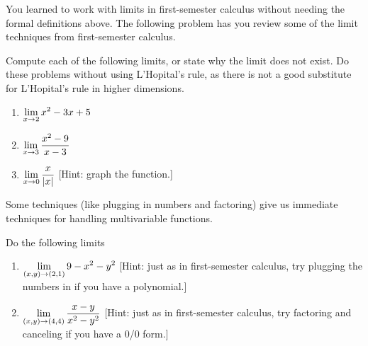 You learned to work with limits in first-semester calculus without needing the formal definitions above. The following problem has you review some of the limit techniques from first-semester calculus.
\begin{problem}%
 Compute each of the following limits, or state why the limit does not exist. Do these problems without using L'Hopital's rule, as there is not a good substitute for L'Hopital's rule in higher dimensions. 
\begin{enumerate}
 \item $\displaystyle \lim_{x\to 2} x^2-3x+5$
 \item $\displaystyle\lim_{x\to 3}\frac{x^2-9}{x-3}$
 \item $\displaystyle\lim_{x\to 0}\frac{x}{|x|}$ [Hint: graph the function.]
\end{enumerate}
\end{problem}

Some techniques (like plugging in numbers and factoring) give us immediate techniques for handling multivariable functions.
\begin{problem} Do the following limits
  \begin{enumerate}
  \item $\displaystyle\lim_{(x,y)\to (2,1)} 9-x^2-y^2$ [Hint: just as in
    first-semester calculus, try plugging the numbers in if you
    have a polynomial.]
  \item $\displaystyle\lim_{(x,y)\to (4,4)} \frac{x-y}{x^2-y^2}$ [Hint: just as
    in first-semester calculus, try factoring and canceling if you
    have a 0/0 form.]
  \end{enumerate}
\end{problem}

